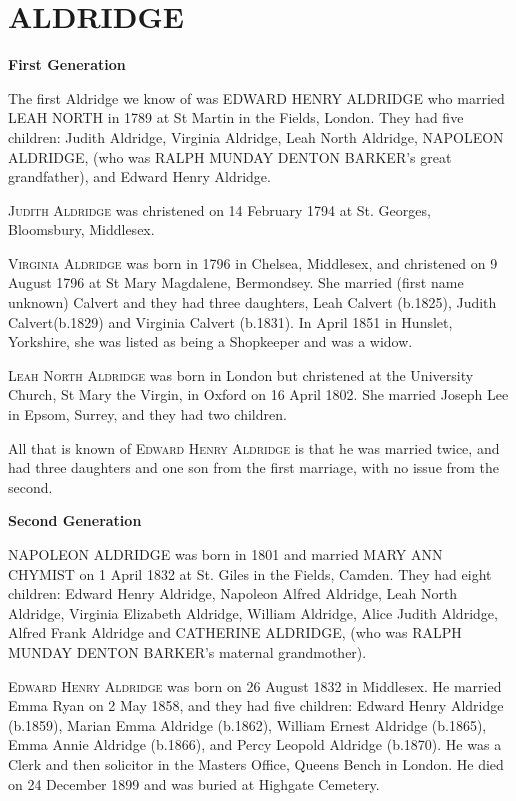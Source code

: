 \section{ALDRIDGE}

\textbf{First Generation}

The first Aldridge we know of was \uppercase{Edward Henry Aldridge} who married \uppercase{Leah North} in 1789 at St Martin in the Fields, London. They had five children: Judith Aldridge, Virginia Aldridge, Leah North Aldridge, \uppercase{Napoleon Aldridge}, (who was \uppercase{Ralph Munday Denton Barker}'s great grandfather), and Edward Henry Aldridge. 

\textsc{Judith Aldridge} was christened on 14 February 1794 at St. Georges,	Bloomsbury, Middlesex.

\textsc{Virginia Aldridge} was born in 1796 in Chelsea, Middlesex, and christened on 9 August 1796 at St Mary Magdalene,  	Bermondsey. She married  (first name unknown) Calvert and they had three daughters, Leah Calvert (b.1825), Judith Calvert(b.1829) and Virginia Calvert (b.1831). In April 1851 in	Hunslet, Yorkshire, she was listed as being a Shopkeeper and was a widow.

\textsc{Leah North Aldridge} was born in London but christened at the University Church, St Mary the Virgin, in Oxford on 16 April 1802. She married Joseph Lee in Epsom, Surrey, and they had two children.

All that is known of \textsc{Edward Henry Aldridge} is that he was married twice, and had three daughters and one son from the first marriage,  with no issue from the second. 

\textbf{Second Generation}

\uppercase{Napoleon Aldridge} was born in 1801 and married \uppercase{Mary Ann Chymist} on 1 April 1832 at St. Giles in the Fields, Camden.  They had eight children: Edward Henry Aldridge, Napoleon Alfred Aldridge, Leah North Aldridge, Virginia Elizabeth Aldridge, William Aldridge, Alice Judith Aldridge, Alfred Frank Aldridge and \uppercase{Catherine Aldridge}, (who was \uppercase{Ralph Munday Denton Barker}'s maternal grandmother).

\textsc{Edward Henry Aldridge} was born on 26 August 1832 in Middlesex. He married Emma Ryan on 2 May 1858, and they had five children: Edward Henry Aldridge (b.1859), Marian Emma Aldridge (b.1862), William Ernest Aldridge (b.1865), Emma Annie Aldridge (b.1866), and Percy Leopold Aldridge (b.1870). He was a Clerk and then solicitor in the Masters Office, Queens Bench in London. He died on 24 December 1899 and was buried at Highgate Cemetery.

